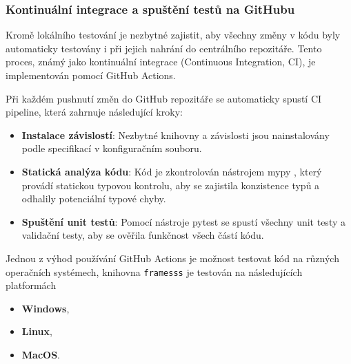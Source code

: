\subsubsection*{Kontinuální integrace a spuštění testů na GitHubu}
Kromě lokálního testování je nezbytné zajistit, aby všechny změny v kódu byly automaticky testovány i při jejich nahrání do centrálního repozitáře. Tento proces, známý jako kontinuální integrace (Continuous Integration, CI), je implementován pomocí GitHub Actions.

Při každém pushnutí změn do GitHub repozitáře se automaticky spustí CI pipeline, která zahrnuje následující kroky:
\begin{itemize}
    \item \textbf{Instalace závislostí}: Nezbytné knihovny a závislosti jsou nainstalovány podle specifikací v konfiguračním souboru.
    \item \textbf{Statická analýza kódu}: Kód je zkontrolován nástrojem mypy \cite{mypy}, který provádí statickou typovou kontrolu, aby se zajistila konzistence typů a odhalily potenciální typové chyby.
    \item \textbf{Spuštění unit testů}: Pomocí nástroje pytest \cite{pytest} se spustí všechny unit testy a validační testy, aby se ověřila funkčnost všech částí kódu.
\end{itemize}

Jednou z výhod používání GitHub Actions je možnost testovat kód na různých operačních systémech, knihovna \texttt{framesss} je testován na následujících platformách
\begin{itemize}
    \item \textbf{Windows},
    \item \textbf{Linux},
    \item \textbf{MacOS}.
\end{itemize}
